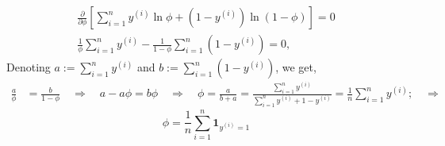 \documentclass{article}
\begin{document}
\begin{enumerate}[label=\alph*)]
\begin{itemize}
\begin{align*}
\frac{\partial}{\partial\phi}\left[\sum_{i=1}^{n} y^{(i)}\ln\phi + (1-y^{(i)})\ln(1-\phi)\right] = 0\\
\frac{1}{\phi}\sum_{i=1}^{n} y^{(i)} - \frac{1}{1-\phi}\sum\limits_{i=1}^{n}(1-y^{(i)})=0,
\end{align*}
Denoting $a:= \sum\limits_{i=1}^{n} y^{(i)}$ and $b:=\sum\limits_{i=1}^{n} (1-y^{(i)})$, we get,
\begin{align*}
\frac{a}{\phi}& = \frac{b}{1-\phi}\quad \Rightarrow \quad a-a\phi = b\phi\quad \Rightarrow \quad\phi = \frac{a}{b+a} = \frac{\sum\limits_{i=1}^{n} y^{(i)}}{\sum\limits_{i=1}^{n} y^{(i)}+1 - y^{(i)} }= \frac{1}{n}\sum\limits_{i=1}^{n} y^{(i)};\quad\Rightarrow
\end{align*}
\[
\boxed{\phi = \frac{1}{n} \sum\limits_{i=1}^{n}\mathbf{1}_{{y^{(i)} = 1}}}
\]


\end{itemize}
\end{enumerate}
\end{document}
